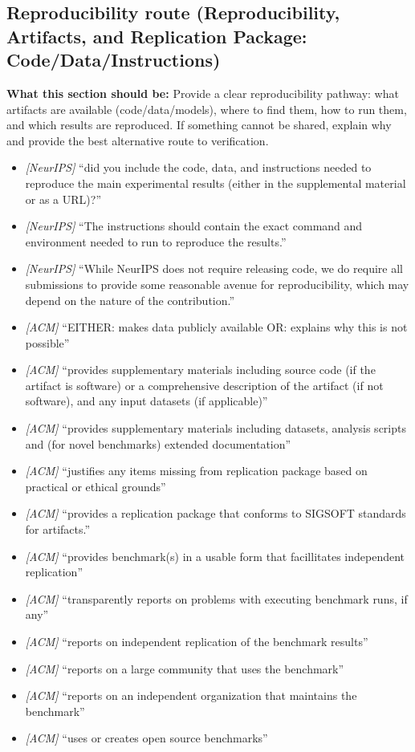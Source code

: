 \documentclass[11pt]{article}
\begin{document}
\subsection{Reproducibility route (Reproducibility, Artifacts, and Replication Package: Code/Data/Instructions)}
\noindent\textbf{What this section should be:}
Provide a clear reproducibility pathway: what artifacts are available (code/data/models), where to find them, how to run them, and which results are reproduced. If something cannot be shared, explain why and provide the best alternative route to verification.
\begin{itemize}
  \item \textit{[NeurIPS]} ``did you include the code, data, and instructions needed to reproduce the main experimental results (either in the supplemental material or as a URL)?''
  \item \textit{[NeurIPS]} ``The instructions should contain the exact command and environment needed to run to reproduce the results.''
  \item \textit{[NeurIPS]} ``While NeurIPS does not require releasing code, we do require all submissions to provide some reasonable avenue for reproducibility, which may depend on the nature of the contribution.''
  \item \textit{[ACM]} ``EITHER: makes data publicly available OR: explains why this is not possible''
  \item \textit{[ACM]} ``provides supplementary materials including source code (if the artifact is software) or a comprehensive description of the artifact (if not software), and any input datasets (if applicable)''
  \item \textit{[ACM]} ``provides supplementary materials including datasets, analysis scripts and (for novel benchmarks) extended documentation''
  \item \textit{[ACM]} ``justifies any items missing from replication package based on practical or ethical grounds''
  \item \textit{[ACM]} ``provides a replication package that conforms to SIGSOFT standards for artifacts.''
  \item \textit{[ACM]} ``provides benchmark(s) in a usable form that facillitates independent replication''
  \item \textit{[ACM]} ``transparently reports on problems with executing benchmark runs, if any''
  \item \textit{[ACM]} ``reports on independent replication of the benchmark results''
  \item \textit{[ACM]} ``reports on a large community that uses the benchmark''
  \item \textit{[ACM]} ``reports on an independent organization that maintains the benchmark''
  \item \textit{[ACM]} ``uses or creates open source benchmarks''
\end{itemize}
\end{document}
